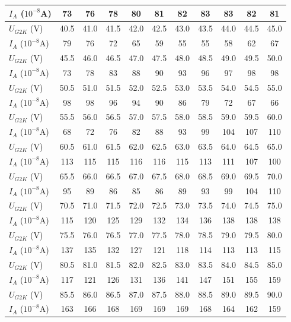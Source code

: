\documentclass[]{../../templates/Report}%
\begin{document}
\begin{fullreportonly}
\begin{table}[H]
{\begin{tabular}{|l|*{10}{C|}}
\hline
$I_A$ ($10^{-8}$A) & 73 & 76 & 78 & 80 & 81 & 82 & 83 & 83 & 82 & 81 \\
\hline
$U_{G2K}$ (V) & 40.5 & 41.0 & 41.5 & 42.0 & 42.5 & 43.0 & 43.5 & 44.0 & 44.5 & 45.0 \\
\hline
$I_A$ ($10^{-8}$A) & 79 & 76 & 72 & 65 & 59 & 55 & 55 & 58 & 62 & 67 \\
\hline
$U_{G2K}$ (V) & 45.5 & 46.0 & 46.5 & 47.0 & 47.5 & 48.0 & 48.5 & 49.0 & 49.5 & 50.0 \\
\hline
$I_A$ ($10^{-8}$A) & 73 & 78 & 83 & 88 & 90 & 93 & 96 & 97 & 98 & 98 \\
\hline
$U_{G2K}$ (V) & 50.5 & 51.0 & 51.5 & 52.0 & 52.5 & 53.0 & 53.5 & 54.0 & 54.5 & 55.0 \\
\hline
$I_A$ ($10^{-8}$A) & 98 & 98 & 96 & 94 & 90 & 86 & 79 & 72 & 67 & 66 \\
\hline
$U_{G2K}$ (V) & 55.5 & 56.0 & 56.5 & 57.0 & 57.5 & 58.0 & 58.5 & 59.0 & 59.5 & 60.0 \\
\hline
$I_A$ ($10^{-8}$A) & 68 & 72 & 76 & 82 & 88 & 93 & 99 & 104 & 107 & 110 \\
\hline
$U_{G2K}$ (V) & 60.5 & 61.0 & 61.5 & 62.0 & 62.5 & 63.0 & 63.5 & 64.0 & 64.5 & 65.0 \\
\hline
$I_A$ ($10^{-8}$A) & 113 & 115 & 115 & 116 & 116 & 115 & 113 & 111 & 107 & 100 \\
\hline
$U_{G2K}$ (V) & 65.5 & 66.0 & 66.5 & 67.0 & 67.5 & 68.0 & 68.5 & 69.0 & 69.5 & 70.0 \\
\hline
$I_A$ ($10^{-8}$A) & 95 & 89 & 86 & 85 & 86 & 89 & 93 & 99 & 104 & 110 \\
\hline
$U_{G2K}$ (V) & 70.5 & 71.0 & 71.5 & 72.0 & 72.5 & 73.0 & 73.5 & 74.0 & 74.5 & 75.0 \\
\hline
$I_A$ ($10^{-8}$A) & 115 & 120 & 125 & 129 & 132 & 134 & 136 & 138 & 138 & 138 \\
\hline
$U_{G2K}$ (V) & 75.5 & 76.0 & 76.5 & 77.0 & 77.5 & 78.0 & 78.5 & 79.0 & 79.5 & 80.0 \\
\hline
$I_A$ ($10^{-8}$A) & 137 & 135 & 132 & 127 & 121 & 118 & 114 & 113 & 113 & 115 \\
\hline
$U_{G2K}$ (V) & 80.5 & 81.0 & 81.5 & 82.0 & 82.5 & 83.0 & 83.5 & 84.0 & 84.5 & 85.0 \\
\hline
$I_A$ ($10^{-8}$A) & 117 & 121 & 126 & 131 & 136 & 141 & 147 & 151 & 155 & 159 \\
\hline
$U_{G2K}$ (V) & 85.5 & 86.0 & 86.5 & 87.0 & 87.5 & 88.0 & 88.5 & 89.0 & 89.5 & 90.0 \\
\hline
$I_A$ ($10^{-8}$A) & 163 & 166 & 168 & 169 & 169 & 169 & 168 & 164 & 162 & 159 \\

\end{tabular}}
\end{table}
\end{fullreportonly}
\end{document}
